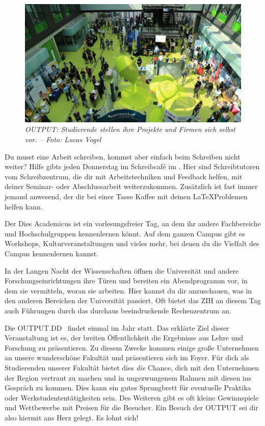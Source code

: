 \begin{figure}[b!]
	\centering
  \includegraphics[width=.95\linewidth,keepaspectratio]{img/output}
  \caption*{\small \centering \textit{OUTPUT\@: Studierende stellen ihre Projekte und Firmen sich selbst vor. -- Foto: Lucas Vogel}}
\end{figure}%


Du musst eine Arbeit schreiben, kommst aber einfach beim Schreiben nicht weiter? Hilfe gibts jeden Donnerstag im Schreibcaf\'e im \ascii. Hier sind Schreibtutoren vom Schreibzentrum, die dir mit Arbeitstechniken und Feedback helfen, mit deiner Seminar- oder Abschlussarbeit weiterzukommen. Zusätzlich ist fast immer jemand anwesend, der dir bei einer Tasse Kaffee mit deinen \LaTeX Problemen helfen kann.



Der Dies Academicus ist ein vorlesungsfreier Tag, an dem ihr andere Fachbereiche und Hochschulgruppen kennenlernen könnt. Auf dem ganzen Campus gibt es Workshops, Kulturveranstaltungen und vieles mehr, bei denen du die Vielfalt des Campus kennenlernen kannst.

\pagebreak


In der Langen Nacht der Wissenschaften öffnen die Universität und andere Forschungseinrichtungen ihre Türen und bereiten ein Abendprogramm vor, in dem sie vermitteln, woran sie arbeiten. Hier kannst du dir anzuschauen, was in den anderen Bereichen der Universität passiert. Oft bietet das ZIH an diesem Tag auch Führungen durch das durchaus beeindruckende Rechenzentrum an.


Die OUTPUT.DD~ findet einmal im Jahr statt. Das erklärte Ziel dieser Veranstaltung ist es, der breiten Öffentlichkeit die Ergebnisse aus Lehre und Forschung zu präsentieren. Zu diesem Zwecke kommen einige große Unternehmen an unsere wunderschöne Fakultät und präsentieren sich im Foyer. Für dich als Studierenden unserer Fakultät bietet dies \emph{die} Chance, dich mit den Unternehmen der Region vertraut zu machen und in ungezwungenem Rahmen mit diesen ins Gespräch zu kommen. Dies kann ein gutes Sprungbrett für eventuelle Praktika oder Werkstudententätigkeiten sein. Des Weiteren gibt es oft kleine Gewinnspiele und Wettbewerbe mit Preisen für die Besucher. Ein Besuch der OUTPUT sei dir also hiermit ans Herz gelegt. Es lohnt sich!

